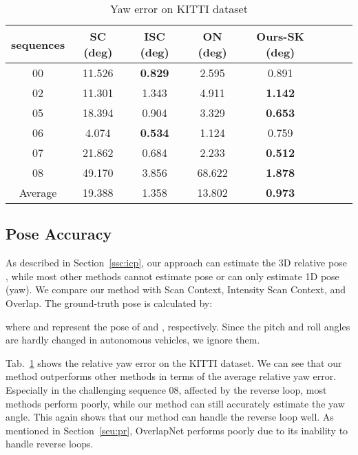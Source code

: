 \documentclass[letterpaper, 10 pt, conference]{ieeeconf}
\begin{document}
    \begin{table}[t]\footnotesize
        \caption{\centering Yaw error on KITTI dataset}\vspace{-3mm}
        \label{table:yaw}
        \begin{center}
        \begin{threeparttable}
            {
        \begin{tabular}{c c c c c c c c}
        \hline
        sequences & SC (deg) & ISC (deg) & ON (deg) & Ours-SK (deg) \\ 
        \hline
        00 & 11.526&\textbf{0.829}&2.595&0.891\\
        02 &11.301&1.343&4.911&\textbf{1.142}\\
        05 &18.394&0.904&3.329&\textbf{0.653}\\
        06 &4.074&\textbf{0.534}&1.124&0.759\\
        07 &21.862&0.684&2.233&\textbf{0.512}\\
        08 &49.170&3.856&68.622&\textbf{1.878}\\
        Average &19.388&1.358&13.802&\textbf{0.973}\\
        \hline
        \end{tabular}
        }
\end{threeparttable}
        \end{center}
        \end{table}
     
\subsection{Pose Accuracy}
As described in Section~\ref{ssc:icp}, our approach can estimate the 3D relative pose , while most other methods cannot estimate pose or can only estimate 1D pose (yaw). We compare our method with Scan Context, Intensity Scan Context, and Overlap. The ground-truth pose is calculated by:

where  and  represent the pose of  and , respectively. Since the pitch and roll angles are hardly changed in autonomous vehicles, we ignore them.

Tab.~\ref{table:yaw} shows the relative yaw error on the KITTI dataset. We can see that our method outperforms other methods in terms of the average relative yaw error. Especially in the challenging sequence 08, affected by the reverse loop, most methods perform poorly, while our method can still accurately estimate the yaw angle. This again shows that our method can handle the reverse loop well. As mentioned in Section~\ref{seu:pr}, OverlapNet performs poorly due to its inability to handle reverse loops.
\end{document}
